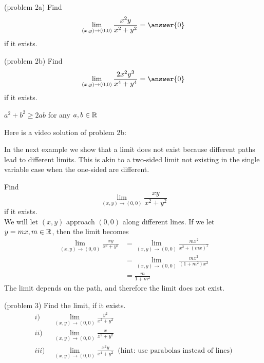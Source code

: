 \documentclass[handout]{ximera}
\begin{document}
\begin{problem}(problem 2a)
Find
\[
\lim_{(x,y) \to (0,0)} \frac{x^2y}{x^2 + y^2} =\answer{0}
\]
if it exists.
\end{problem}


\begin{problem}(problem 2b)
Find
\[
\lim_{(x,y) \to (0,0)} \frac{2x^2y^3}{x^4 + y^4} =\answer{0}
\]
if it exists.
\begin{hint}
$a^2 + b^2 \geq 2ab$ for any $a, b \in \mathbb R$
\end{hint}

\end{problem}

Here is a video solution of problem 2b:\\
\begin{foldable}
\end{foldable}


In the next example we show that a limit does not exist because different paths lead to different limits. This is akin to 
a two-sided limit not existing in the single variable case when the one-sided are different.

\begin{example}[example 3]
Find
\[
\lim_{(x,y) \to (0,0)} \frac{xy}{x^2 + y^2}
\]
if it exists.\\
We will let $(x,y)$ approach $(0,0)$ along different lines. If we let $y = mx, m \in \mathbb R$, then the limit becomes
\begin{align*}
\lim_{(x,y) \to (0,0)} \frac{xy}{x^2 + y^2} &= \lim_{(x,y) \to (0,0)} \frac{mx^2}{x^2 + (mx)^2} \\
                                            &= \lim_{(x,y) \to (0,0)} \frac{mx^2}{(1+m^2)x^2}\\
                                            &  = \frac{m}{1+m^2}
\end{align*}
The limit depends on the path, and therefore the limit does not exist.
\end{example}

\begin{problem}(problem 3)
Find the limit, if it exists.
\begin{align*}
i) \; & \lim_{(x,y) \to (0,0)} \frac{y^2}{x^2 + y^2} \\
ii) \; & \lim_{(x,y) \to (0,0)} \frac{x}{x^2 + y^2}\\
iii) \; & \lim_{(x,y) \to (0,0)} \frac{x^2y}{x^4 + y^2} \;\; \mbox{(hint: use parabolas instead of lines)}
\end{align*}
\end{problem}
\end{document}
